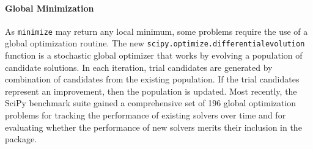 \paragraph{Global Minimization}
As \texttt{minimize} may return any local minimum, some problems require the use of a global optimization routine. The new \texttt{scipy.optimize.differential\textunderscore evolution} function \cite{Wormington1999,Storn1997} is a stochastic global optimizer that works by evolving a population of candidate solutions. In each iteration, trial candidates are generated by combination of candidates from the existing population. If the trial candidates represent an improvement, then the population is updated. Most recently, the SciPy benchmark suite gained a comprehensive set of 196 global optimization problems for tracking the performance of existing solvers over time and for evaluating whether the performance of new solvers merits their inclusion in the package.

